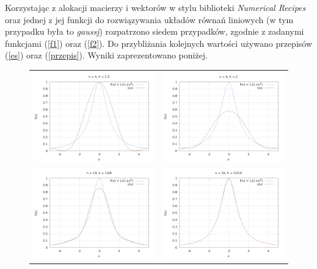 Korzystając z alokacji macierzy i wektorów w stylu biblioteki \textit{Numerical Recipes} oraz jednej z jej funkcji do rozwiązywania układów równań liniowych (w tym przypadku była to \textit{gaussj}) rozpatrzono siedem przypadków, zgodnie z zadanymi funkcjami (\ref{f1}) oraz (\ref{f2}). Do przybliżania kolejnych wartości używano przepisów (\ref{es}) oraz (\ref{przepis}). Wyniki zaprezentowano poniżej.
\newpage
\begin{figure}[h!]
	\begin{tabular}{cc}
		\includegraphics[width=81mm]{f1n5.png} &   \includegraphics[width=81mm]{f1n6.png} \\
		[6pt]
		\includegraphics[width=81mm]{f1n10.png} &   \includegraphics[width=81mm]{f1n20.png} \\

\end{tabular}
\end{figure}
